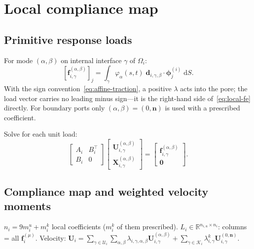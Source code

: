 \documentclass[11pt,a4paper]{article}
\newcommand{\R}{\mathbb{R}}
\newcommand{\pore}[1]{\Omega_{#1}}
\newcommand{\normal}{\bm{n}}
\begin{document}
\section{Local compliance map}
\label{sec:local-dtn}

\subsection{Primitive response loads}

For mode $(\alpha,\beta)$ on internal interface $\gamma$ of $\pore{i}$:
\begin{equation}\label{eq:load}
  [\bm{f}_{i,\gamma}^{(\alpha,\beta)}]_j
  = \int_{\gamma} \varphi_\alpha(s,t)\;
    \bm{d}_{i,\gamma,\beta} \cdot \bm{\phi}_j^{(i)} \;\mathrm{d}S.
\end{equation}
With the sign convention~\eqref{eq:affine-traction}, a positive
$\lambda$ acts into the pore; the load vector carries no leading minus
sign---it is the right-hand side of~\eqref{eq:local-fe} directly.
For boundary ports only $(\alpha,\beta)=(0,\normal)$ is used with a
prescribed coefficient.

Solve for each unit load:
\begin{equation}\label{eq:response}
  \begin{bmatrix} A_i & B_i^\top \\ B_i & 0 \end{bmatrix}
  \begin{bmatrix} \mathbf{U}_{i,\gamma}^{(\alpha,\beta)} \\
                   \mathbf{X}_{i,\gamma}^{(\alpha,\beta)} \end{bmatrix}
  = \begin{bmatrix} \bm{f}_{i,\gamma}^{(\alpha,\beta)} \\ \bm{0} \end{bmatrix}.
\end{equation}

\subsection{Compliance map and weighted velocity moments}

$n_i = 9m_i^u + m_i^k$ local coefficients ($m_i^k$ of them prescribed).
$L_i \in \R^{n_{i,u}\times n_i}$: columns = all $\bm{f}_i^{(\mu)}$.
Velocity: $\mathbf{U}_i = \sum_{\gamma\in\mathcal{U}_i}\sum_{\alpha,\beta}
  \lambda_{i,\gamma,\alpha,\beta}\mathbf{U}_{i,\gamma}^{(\alpha,\beta)}
  + \sum_{\gamma\in\mathcal{K}_i}\lambda_{i,\gamma}^k
    \mathbf{U}_{i,\gamma}^{(0,\normal)}$.
\end{document}
